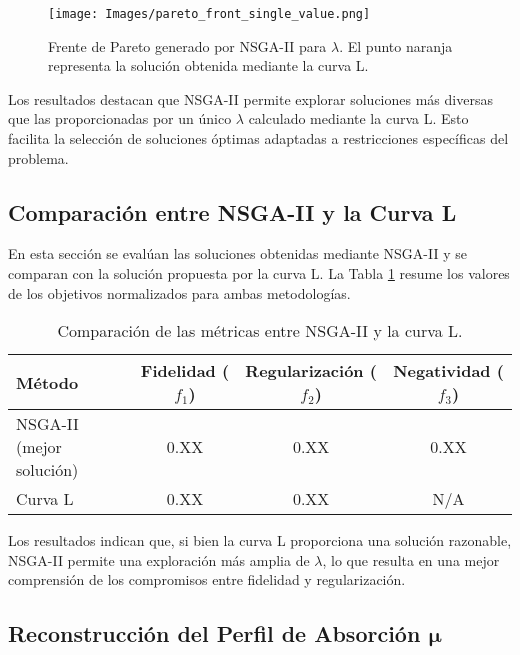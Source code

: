 \begin{figure}[h]
    \centering
    \texttt{[image: Images/pareto\_front\_single\_value.png]}
    \caption{Frente de Pareto generado por NSGA-II para \( \lambda \). El punto naranja representa la solución obtenida mediante la curva L.}
    \label{fig:pareto_front}
\end{figure}

Los resultados destacan que NSGA-II permite explorar soluciones más diversas que las proporcionadas por un único \( \lambda \) calculado mediante la curva L. Esto facilita la selección de soluciones óptimas adaptadas a restricciones específicas del problema.

\subsection{Comparación entre NSGA-II y la Curva L} \label{sec:results:comparison}

En esta sección se evalúan las soluciones obtenidas mediante NSGA-II y se comparan con la solución propuesta por la curva L. La Tabla \ref{tab:comparison} resume los valores de los objetivos normalizados para ambas metodologías.

\begin{table}[h]
    \centering
    \begin{tabular}{lccc}
        \toprule
        Método & Fidelidad (\( f_1 \)) & Regularización (\( f_2 \)) & Negatividad (\( f_3 \)) \\
        \midrule
        NSGA-II (mejor solución) & 0.XX & 0.XX & 0.XX \\
        Curva L & 0.XX & 0.XX & N/A \\
        \bottomrule
    \end{tabular}
    \caption{Comparación de las métricas entre NSGA-II y la curva L.}
    \label{tab:comparison}
\end{table}

Los resultados indican que, si bien la curva L proporciona una solución razonable, NSGA-II permite una exploración más amplia de \( \lambda \), lo que resulta en una mejor comprensión de los compromisos entre fidelidad y regularización.

\subsection{Reconstrucción del Perfil de Absorción \( \mathbf{\mu} \)} \label{sec:results:reconstruction}

